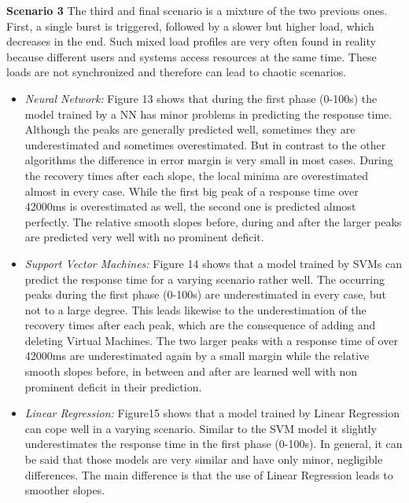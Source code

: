 \textbf{Scenario 3} 
The third and final scenario is a mixture of the two previous ones. First, a single burst is triggered, followed by a slower but higher load, which decreases in the end. Such mixed load profiles are very often found in reality because different users and systems access resources at the same time. These loads are not synchronized and therefore can lead to chaotic scenarios.

\begin{itemize}
\item \textit{Neural Network:} Figure 13 shows that during the first phase (0-100s) the model trained by a NN has minor problems in predicting the response time. Although the peaks are generally predicted well, sometimes they are underestimated and sometimes overestimated. But in contrast to the other algorithms the difference in error margin is very small in most cases. During the recovery times after each slope, the local minima are overestimated almost in every case. While the first big peak of a response time over 42000ms is overestimated as well, the second one is predicted almost perfectly. The relative smooth slopes before, during and after the larger peaks are predicted very well with no prominent deficit. 

\item \textit{Support Vector Machines:} Figure 14 shows that a model trained by SVMs can predict the response time for a varying scenario rather well. The occurring peaks during the first phase (0-100s) are underestimated in every case, but not to a large degree. This leads likewise to the underestimation of the recovery times after each peak, which are the consequence of adding and deleting Virtual Machines. The two larger peaks with a response time of over 42000ms are underestimated again by a small margin while the relative smooth slopes before, in between and after are learned well with non prominent deficit in their prediction. 

\item \textit{Linear Regression:} Figure15 shows that a model trained by Linear Regression can cope well in a varying scenario. Similar to the SVM model it slightly underestimates the response time in the first phase (0-100s). In general, it can be said that those models are very similar and have only minor, negligible differences. The main difference is that the use of Linear Regression leads to smoother slopes.
\end{itemize}

